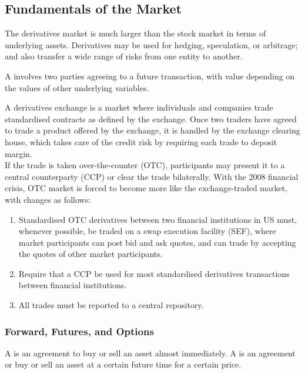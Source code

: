\subsection{Fundamentals of the Market}

The derivatives market is much larger than the stock market in terms of underlying assets. Derivatives may be used for hedging, speculation, or arbitrage; and also transfer a wide range of risks from one entity to another.

\begin{definition} A  involves two parties agreeing to a future transaction, with value depending on the values of other underlying variables.
\end{definition}

A derivatives exchange is a market where individuals and companies trade standardised contracts as defined by the exchange. Once two traders have agreed to trade a product offered by the exchange, it is handled by the exchange clearing house, which takes care of the credit risk by requiring each trade to deposit margin.\\

If the trade is taken over-the-counter (OTC), participants may present it to a central counterparty (CCP) or clear the trade bilaterally. With the 2008 financial crisis, OTC market is forced to become more like the exchange-traded market, with changes as follows:
\begin{enumerate}[label=\roman*.]
\setlength{\itemsep}{0pt}
\item Standardised OTC derivatives between two financial institutions in US must, whenever possible, be traded on a swap execution facility (SEF), where market participants can post bid and ask quotes, and can trade by accepting the quotes of other market participants.
\item Require that a CCP be used for most standardised derivatives transactions between financial institutions.
\item All trades must be reported to a central repository.
\end{enumerate}

\subsubsection{Forward, Futures, and Options}

\begin{definition} A  is an agreement to buy or sell an asset almost immediately. A  is an agreement or buy or sell an asset at a certain future time for a certain price.
\end{definition}


